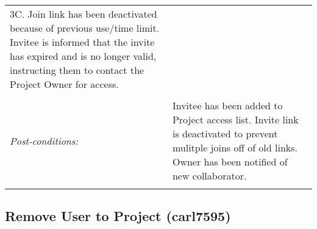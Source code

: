 \begin{tabular}{ p{2cm} p{12cm} }
	3C. Join link has been deactivated because of previous use/time limit. Invitee is informed that the invite has expired and is no longer valid, instructing them to contact the Project Owner for access. \\
 \\
 \textit{Post-conditions:} & Invitee has been added to Project access list. Invite link is deactivated to prevent mulitple joins off of old links. Owner has been notified of new collaborator. \\
 \\
\hline
\end{tabular}

\subsection{Remove User to Project (carl7595)}

